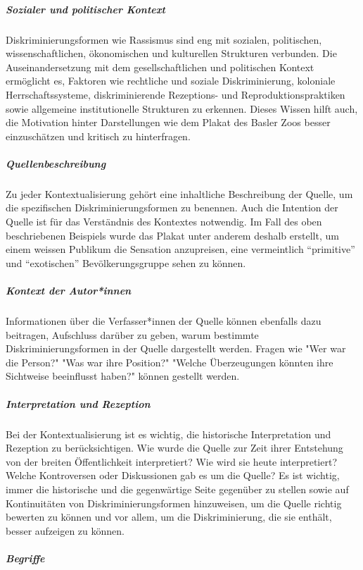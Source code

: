 \documentclass[
  letterpaper,
  DIV=11,
  numbers=noendperiod,
  landscape,
  a4paper,
  geometry:margin=1in]{scrartcl}
\let\oldsubparagraph\subparagraph
\renewcommand{\subparagraph}[1]{\oldsubparagraph{#1}\mbox{}}
\begin{document}
\subparagraph{Sozialer und politischer
Kontext}\label{sozialer-und-politischer-kontext}

Diskriminierungsformen wie Rassismus sind eng mit sozialen, politischen,
wissenschaftlichen, ökonomischen und kulturellen Strukturen verbunden.
Die Auseinandersetzung mit dem gesellschaftlichen und politischen
Kontext ermöglicht es, Faktoren wie rechtliche und soziale
Diskriminierung, koloniale Herrschaftssysteme, diskriminierende
Rezeptions- und Reproduktionspraktiken sowie allgemeine institutionelle
Strukturen zu erkennen. Dieses Wissen hilft auch, die Motivation hinter
Darstellungen wie dem Plakat des Basler Zoos besser einzuschätzen und
kritisch zu hinterfragen.

\subparagraph{Quellenbeschreibung}\label{quellenbeschreibung}

Zu jeder Kontextualisierung gehört eine inhaltliche Beschreibung der
Quelle, um die spezifischen Diskriminierungsformen zu benennen. Auch die
Intention der Quelle ist für das Verständnis des Kontextes notwendig. Im
Fall des oben beschriebenen Beispiels wurde das Plakat unter anderem
deshalb erstellt, um einem weissen Publikum die Sensation anzupreisen,
eine vermeintlich ``primitive'' und ``exotischen'' Bevölkerungsgruppe
sehen zu können.

\subparagraph{Kontext der Autor*innen}\label{kontext-der-autorinnen}

Informationen über die Verfasser*innen der Quelle können ebenfalls dazu
beitragen, Aufschluss darüber zu geben, warum bestimmte
Diskriminierungsformen in der Quelle dargestellt werden. Fragen wie "Wer
war die Person?" "Was war ihre Position?" "Welche Überzeugungen könnten
ihre Sichtweise beeinflusst haben?" können gestellt werden.

\subparagraph{Interpretation und
Rezeption}\label{interpretation-und-rezeption}

Bei der Kontextualisierung ist es wichtig, die historische
Interpretation und Rezeption zu berücksichtigen. Wie wurde die Quelle
zur Zeit ihrer Entstehung von der breiten Öffentlichkeit interpretiert?
Wie wird sie heute interpretiert? Welche Kontroversen oder Diskussionen
gab es um die Quelle? Es ist wichtig, immer die historische und die
gegenwärtige Seite gegenüber zu stellen sowie auf Kontinuitäten von
Diskriminierungsformen hinzuweisen, um die Quelle richtig bewerten zu
können und vor allem, um die Diskriminierung, die sie enthält, besser
aufzeigen zu können.

\subparagraph{Begriffe}\label{begriffe}
\end{document}
